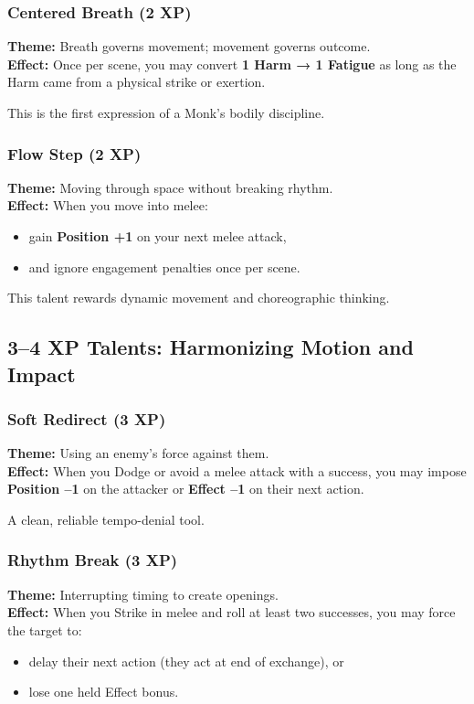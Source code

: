\documentclass[11pt]{book}
\begin{document}
\subsubsection{Centered Breath (2 XP)}
\textbf{Theme:} Breath governs movement; movement governs outcome.\\
\textbf{Effect:} Once per scene, you may convert \textbf{1 Harm → 1 Fatigue}
as long as the Harm came from a physical strike or exertion.

This is the first expression of a Monk's bodily discipline.

\subsubsection{Flow Step (2 XP)}
\textbf{Theme:} Moving through space without breaking rhythm.\\
\textbf{Effect:} When you move into melee:
\begin{itemize}
  \item gain \textbf{Position +1} on your next melee attack,
  \item and ignore engagement penalties once per scene.
\end{itemize}

This talent rewards dynamic movement and choreographic thinking.

\subsection{3--4 XP Talents: Harmonizing Motion and Impact}

\subsubsection{Soft Redirect (3 XP)}
\textbf{Theme:} Using an enemy's force against them.\\
\textbf{Effect:} When you Dodge or avoid a melee attack with a success,
you may impose \textbf{Position --1} on the attacker or
\textbf{Effect --1} on their next action.

A clean, reliable tempo-denial tool.

\subsubsection{Rhythm Break (3 XP)}
\textbf{Theme:} Interrupting timing to create openings.\\
\textbf{Effect:} When you Strike in melee and roll at least two successes,
you may force the target to:
\begin{itemize}
  \item delay their next action (they act at end of exchange), or
  \item lose one held Effect bonus.
\end{itemize}
\end{document}
